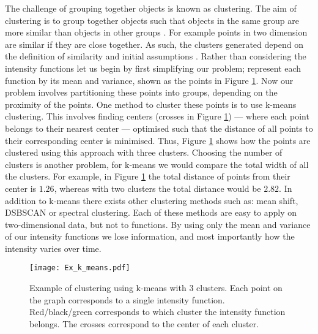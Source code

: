 \documentclass[12pt]{book} %
\begin{document}
The challenge of grouping together objects is known as clustering. The aim of clustering is to group together objects such that objects in the same group are more similar than objects in other groups \cite{}. For example points in two dimension are similar if they are close together. As such, the clusters generated depend on the definition of similarity and initial assumptions \cite{}. Rather than considering the intensity functions let us begin by first simplifying our problem; represent each function by its mean and variance, shown as the points in Figure \ref{fig:k_means}. Now our problem involves partitioning these points into groups, depending on the proximity of the points. One method to cluster these points is to use k-means clustering. This involves finding centers (crosses in Figure \ref{fig:k_means}) ---  where each point belongs to their nearest center --- optimised such that the distance of all points to their corresponding center is minimised. Thus, Figure \ref{fig:k_means} shows how the points are clustered using this approach with three clusters. Choosing the number of clusters is another problem, for k-means we would compare the total width of all the clusters. For example, in Figure \ref{fig:k_means} the total distance of points from their center is $ 1.26$, whereas with two clusters the total distance would be $2.82$. In addition to k-means there exists other clustering methods such as: mean shift, DSBSCAN or spectral clustering. Each of these methods are easy to apply on two-dimensional data, but not to functions. By using only the mean and variance of our intensity functions we lose information, and most importantly how the intensity varies over time.  
     \begin{figure}[t!]
   \hrulefill
   \begin{center} 
   {\texttt{[image: Ex\_k\_means.pdf]} }
    \end{center}     
    \caption{Example of clustering using k-means with 3 clusters. Each point on the graph corresponds to a single intensity function. Red/black/green corresponds to which cluster the intensity function belongs. The crosses correspond to the center of each cluster.}
    \label{fig:k_means}
    \hrulefill
    \end{figure}
    
\end{document}
